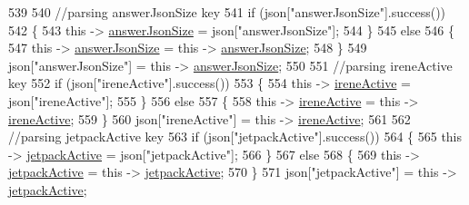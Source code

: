 \begin{DoxyCode}
539             
540             \textcolor{comment}{//parsing answerJsonSize key            }
541             \textcolor{keywordflow}{if} (json[\textcolor{stringliteral}{"answerJsonSize"}].success())
542             \{
543                 \textcolor{keyword}{this} -> \hyperlink{classCoolBoard_af2da1f85315b3d074a8b87d158094fb7}{answerJsonSize} = json[\textcolor{stringliteral}{"answerJsonSize"}];
544             \}
545             \textcolor{keywordflow}{else}
546             \{
547                 \textcolor{keyword}{this} -> \hyperlink{classCoolBoard_af2da1f85315b3d074a8b87d158094fb7}{answerJsonSize} = \textcolor{keyword}{this} -> \hyperlink{classCoolBoard_af2da1f85315b3d074a8b87d158094fb7}{answerJsonSize};
548             \}
549             json[\textcolor{stringliteral}{"answerJsonSize"}] = \textcolor{keyword}{this} -> \hyperlink{classCoolBoard_af2da1f85315b3d074a8b87d158094fb7}{answerJsonSize};
550             
551             \textcolor{comment}{//parsing ireneActive key           }
552             \textcolor{keywordflow}{if} (json[\textcolor{stringliteral}{"ireneActive"}].success())
553             \{
554                 \textcolor{keyword}{this} -> \hyperlink{classCoolBoard_a9c3f7ac625481ee2ae802a25d97a4ae0}{ireneActive} = json[\textcolor{stringliteral}{"ireneActive"}];
555             \}
556             \textcolor{keywordflow}{else}
557             \{
558                 \textcolor{keyword}{this} -> \hyperlink{classCoolBoard_a9c3f7ac625481ee2ae802a25d97a4ae0}{ireneActive} = \textcolor{keyword}{this} -> \hyperlink{classCoolBoard_a9c3f7ac625481ee2ae802a25d97a4ae0}{ireneActive};
559             \}
560             json[\textcolor{stringliteral}{"ireneActive"}] = \textcolor{keyword}{this} -> \hyperlink{classCoolBoard_a9c3f7ac625481ee2ae802a25d97a4ae0}{ireneActive};
561             
562             \textcolor{comment}{//parsing jetpackActive key}
563             \textcolor{keywordflow}{if} (json[\textcolor{stringliteral}{"jetpackActive"}].success())
564             \{
565                 \textcolor{keyword}{this} -> \hyperlink{classCoolBoard_a9be03a913d26e558328935ca3b59a75e}{jetpackActive} = json[\textcolor{stringliteral}{"jetpackActive"}];
566             \}
567             \textcolor{keywordflow}{else}
568             \{
569                 \textcolor{keyword}{this} -> \hyperlink{classCoolBoard_a9be03a913d26e558328935ca3b59a75e}{jetpackActive} = \textcolor{keyword}{this} -> \hyperlink{classCoolBoard_a9be03a913d26e558328935ca3b59a75e}{jetpackActive};
570             \}
571             json[\textcolor{stringliteral}{"jetpackActive"}] = \textcolor{keyword}{this} -> \hyperlink{classCoolBoard_a9be03a913d26e558328935ca3b59a75e}{jetpackActive};

\end{DoxyCode}
